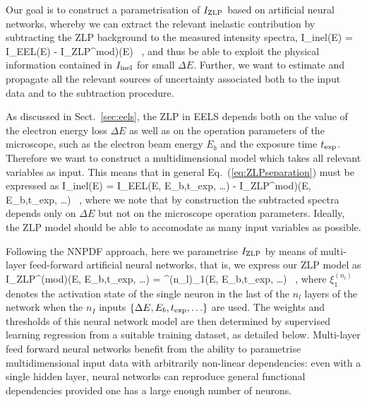 Our goal is to construct a parametrisation of $I_{\rm ZLP}$ based on artificial
neural networks, whereby we can extract the relevant inelastic contribution by subtracting the
ZLP background to the measured intensity spectra,
\be
\label{eq:ZLPseparation}
I_{\rm inel}(\Delta E) = I_{\rm EEL}(\Delta E) - I_{\rm ZLP}^{\rm mod)}(\Delta E) \, ,
\ee
and thus be able to exploit the physical information contained in $I_{\rm inel}$ for small $\Delta E$.
%
Further, we want to estimate and propagate all the relevant sources of uncertainty associated
both to the input data and to the subtraction procedure.


As discussed in Sect.~\ref{sec:eels}, the ZLP in EELS depends both
on the value of the electron energy loss $\Delta E$ as well as on the operation
parameters of the microscope, such as the electron beam energy $E_b$ and the exposure time
$t_{\rm exp}$.
%
Therefore we want to construct a multidimensional model which takes all relevant
variables as input.
%
This means that in general Eq.~(\ref{eq:ZLPseparation}) must be expressed as
\be
I_{\rm inel}(\Delta E) = I_{\rm EEL}(\Delta E, E_{b},t_{\rm exp}, \ldots) - I_{\rm ZLP}^{\rm mod)}(\Delta E, E_{b},t_{\rm exp}, \ldots) \, ,
\ee
where we note that by construction the subtracted spectra depends only on $\Delta E$ but not on the microscope
operation parameters.
%
Ideally, the ZLP model should be able to accomodate as many input variables as possible.

Following the NNPDF approach, here we parametrise $I_{\rm ZLP}$ by means of
multi-layer feed-forward artificial neural networks, that is, we express our ZLP model as
\be
\label{eq:ZLPmodelNN}
I_{\rm ZLP}^{\rm (mod)}(\Delta E, E_{b},t_{\rm exp}, \ldots)  = \xi^{(n_l)}_1(\Delta E, E_{b},t_{\rm exp}, \ldots) \, ,
\ee
where $\xi^{(n_l)}_1$ denotes the activation state of the single neuron in the last
of the $n_l$ layers of the network when the $n_I$ inputs $\{ \Delta E, E_{b},t_{\rm exp}, \ldots \}$
are used.
%
The weights and thresholds of this neural network model are then determined
by supervised learning regression from a suitable training dataset, as
detailed below.
%
Multi-layer feed forward neural networks benefit from the ability
to parametrise multidimensional input data with arbitrarily
non-linear dependencies: even with a single hidden layer, neural networks
can reproduce general functional dependencies provided one has a large enough
number of neurons.

